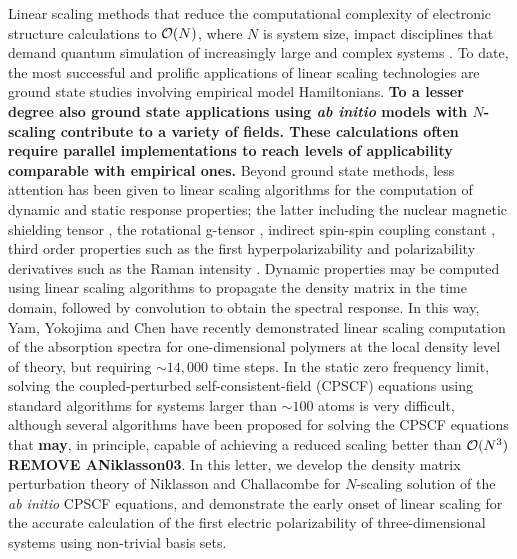 \documentclass[prl,aps,twocolumn,showpacs,twocolumngrid,superbib]{revtex4}
\begin{document}
Linear scaling methods that reduce the computational complexity of 
electronic structure calculations to ${\cal O}(N)$, where $N$ is system size, 
impact disciplines that demand quantum simulation of increasingly large and complex systems
\cite{GGalli96,DBowler97,SGoedecker99,POrdejon00,VGogonea01,SWu02}. 
To date, the most successful and prolific applications of linear scaling technologies are
ground state studies involving empirical model Hamiltonians.  
{\bf To a lesser degree also ground state applications using {\em ab initio} models 
with $N$-scaling contribute to a variety of fields. These calculations
often require parallel implementations to reach levels of applicability comparable with
empirical ones.}
Beyond ground state methods, less attention has been given 
to linear scaling algorithms for the computation of dynamic and static response 
properties; the latter including the nuclear magnetic shielding tensor \cite{Pulay_1990}, 
the rotational g-tensor \cite{Helgaker_1996}, indirect spin-spin coupling constant 
\cite{Pennington_1991,Malkin_1996}, third order  properties such as the first hyperpolarizability 
\cite{Franky_1997} and polarizability derivatives such as the Raman intensity 
\cite{Lazzeri_2003,Champagne_2001}.  Dynamic  properties may be computed using 
linear scaling algorithms to propagate the density matrix \cite{SNomura97,CYam03} in 
the time domain, followed by convolution to obtain the spectral response.  In this way, 
Yam, Yokojima and Chen \cite{CYam03} have recently demonstrated linear scaling 
computation of the absorption spectra for one-dimensional polymers at the local 
density level of theory, but requiring $\sim 14,000$ time steps.  
In the static zero frequency limit, solving the coupled-perturbed self-consistent-field 
(CPSCF) equations using standard algorithms for systems larger than $\sim 100$ atoms 
is very difficult, although several algorithms have been proposed for 
solving the CPSCF equations that {\bf may}, in principle, capable of achieving a reduced scaling 
better than ${\cal O}(N^3)$\cite{COchsenfeld97,HLarsen00} {\bf REMOVE ANiklasson03}.   
In this letter, we develop the density matrix perturbation theory of  Niklasson and Challacombe 
\cite{ANiklasson03} for $N$-scaling solution of the {\em ab initio} CPSCF equations, and 
demonstrate the early onset of linear scaling for the accurate calculation of the first electric 
polarizability of three-dimensional systems using non-trivial basis sets.
\end{document}
